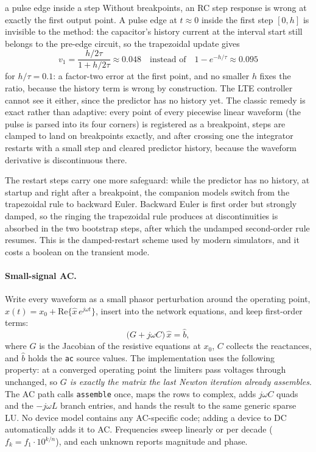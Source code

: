 \documentclass[11pt]{article}
\begin{document}
\begin{fieldnote}{a pulse edge inside a step}
Without breakpoints, an RC step response is wrong at exactly the first
output point. A pulse edge at
$t \approx 0$ inside the first step $[0, h]$ is invisible to the method:
the capacitor's history current at the interval start still belongs to
the pre-edge circuit, so the trapezoidal update gives
\[
v_1 = \frac{h/2\tau}{1 + h/2\tau} \approx 0.048
\quad\text{instead of}\quad
1 - e^{-h/\tau} \approx 0.095
\]
for $h/\tau = 0.1$: a factor-two error at the first point, and no
smaller $h$ fixes the ratio, because the history term is wrong by
construction. The LTE controller cannot see it either, since the
predictor has no history yet. The classic remedy is exact rather than
adaptive: every point of every piecewise linear waveform (the pulse is
parsed into its four corners) is registered as a breakpoint, steps are
clamped to land on breakpoints exactly, and after crossing one the
integrator restarts with a small step and cleared predictor history,
because the waveform derivative is discontinuous there.

The restart steps carry one more safeguard: while the predictor has no
history, at startup and right after a breakpoint, the companion models
switch from the trapezoidal rule to backward Euler. Backward Euler is
first order but strongly damped, so the ringing the trapezoidal rule
produces at discontinuities is absorbed in the two bootstrap steps, after
which the undamped second-order rule resumes. This is the damped-restart
scheme used by modern simulators, and it costs a boolean on the transient
mode.
\end{fieldnote}

\paragraph{Small-signal AC.}
Write every waveform as a small phasor perturbation around the operating
point, $x(t) = x_0 + \mathrm{Re}\{\hat{x}\, e^{j\omega t}\}$, insert into
the network equations, and keep first-order terms:
\[
\bigl( G + j\omega C \bigr)\, \hat{x} = \hat{b},
\]
where $G$ is the Jacobian of the resistive equations at $x_0$, $C$
collects the reactances, and $\hat{b}$ holds the \texttt{ac} source
values. The implementation uses the following property: at a converged
operating point the limiters pass voltages through unchanged, so
\emph{$G$ is exactly the matrix the last Newton iteration already
assembles}. The AC path calls \texttt{assemble} once, maps the rows to
complex, adds $j\omega C$ quads and the $-j\omega L$ branch entries, and
hands the result to the same generic sparse LU. No device model contains
any AC-specific code; adding a device to DC automatically adds it to AC.
Frequencies sweep linearly or per decade
($f_k = f_1 \cdot 10^{k/n}$), and each unknown reports magnitude and
phase.
\end{document}
